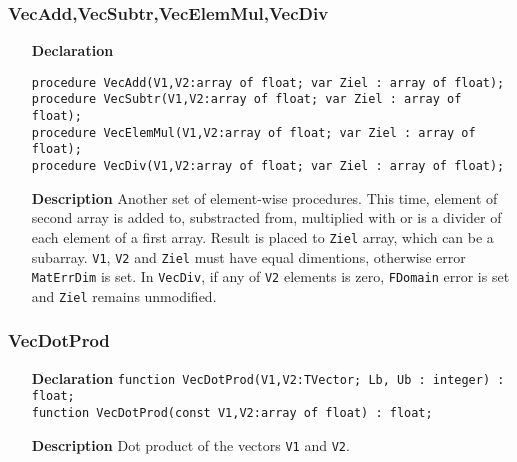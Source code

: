 \documentclass[12pt,a4paper,oneside]{report}
\newcommand{\declarationitem}[1]{\textbf{#1}}
\newcommand{\descriptiontitle}[1]{\textbf{#1}}
\newcommand{\code}[1]{\texttt{#1}}
\begin{document}
\subsubsection{VecAdd,VecSubtr,VecElemMul,VecDiv}
\label{VecAdd}
\begin{itemize}
	\item[\declarationitem{Declaration}\hfill]
	\begin{flushleft}
\code{procedure VecAdd(V1,V2:array of float; var Ziel : array of float);}\\
\code{procedure VecSubtr(V1,V2:array of float; var Ziel : array of float);}\\
\code{procedure VecElemMul(V1,V2:array of float; var Ziel : array of float);}\\
\code{procedure VecDiv(V1,V2:array of float; var Ziel : array of float);}\\
	\end{flushleft}
	\item[\descriptiontitle{Description}]
	Another set of element-wise procedures. This time, element of second array is added to, substracted from, multiplied with or is a divider of each element of a first array. Result is placed to \code{Ziel} array, which can be a subarray.
	\code{V1}, \code{V2} and \code{Ziel} must have equal dimentions, otherwise error \code{MatErrDim} is set. In \code{VecDiv}, if any of \code{V2} elements is zero, \code{FDomain} error is set and \code{Ziel} remains unmodified.
\end{itemize} 
\subsubsection{VecDotProd}
\label{VecDotProd}
\begin{itemize}
	\item[\declarationitem{Declaration}\hfill]
	\code{function VecDotProd(V1,V2:TVector; Lb, Ub : integer) : float;}\\
	\code{function VecDotProd(const V1,V2:array of float) : float;}
	\item[\descriptiontitle{Description}]Dot product of the vectors \code{V1} and \code{V2}.
\end{itemize}
\end{document}

